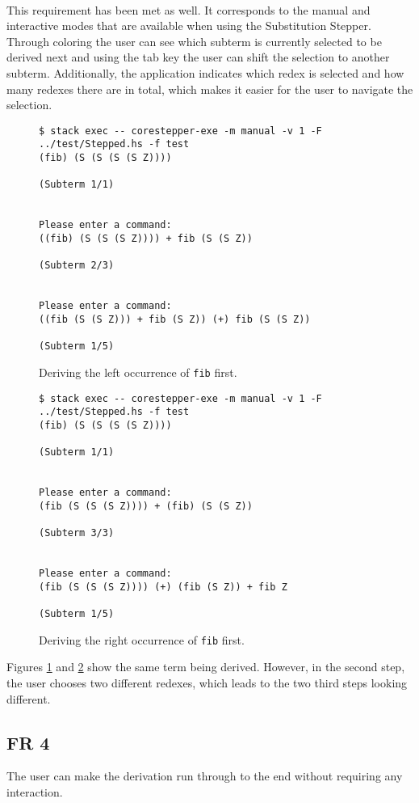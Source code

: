 \ \\
This requirement has been met as well.
It corresponds to the manual and interactive modes that are available when using the Substitution Stepper.
Through coloring the user can see which subterm is currently selected to be derived next and using the tab key the user can shift the selection to another subterm.
Additionally, the application indicates which redex is selected and how many redexes there are in total,
which makes it easier for the user to navigate the selection.

\begin{figure}[!ht]
\begin{verbatim}
$ stack exec -- corestepper-exe -m manual -v 1 -F ../test/Stepped.hs -f test
(fib) (S (S (S (S Z))))

(Subterm 1/1)


Please enter a command:
((fib) (S (S (S Z)))) + fib (S (S Z))

(Subterm 2/3)


Please enter a command:
((fib (S (S Z))) + fib (S Z)) (+) fib (S (S Z))

(Subterm 1/5)
\end{verbatim}
    \caption{Deriving the left occurrence of \texttt{fib} first.}
    \label{fig:FR3example1}
\end{figure}

\begin{figure}[!ht]
\begin{verbatim}
$ stack exec -- corestepper-exe -m manual -v 1 -F ../test/Stepped.hs -f test
(fib) (S (S (S (S Z))))

(Subterm 1/1)


Please enter a command:
(fib (S (S (S Z)))) + (fib) (S (S Z))

(Subterm 3/3)


Please enter a command:
(fib (S (S (S Z)))) (+) (fib (S Z)) + fib Z

(Subterm 1/5)
\end{verbatim}
    \caption{Deriving the right occurrence of \texttt{fib} first.}
    \label{fig:FR3example2}
\end{figure}

Figures \ref*{fig:FR3example1} and \ref*{fig:FR3example2} show the same term being derived.
However, in the second step, the user chooses two different redexes,
which leads to the two third steps looking different.

\subsection{FR 4}
The user can make the derivation run through to the end without requiring any interaction.

